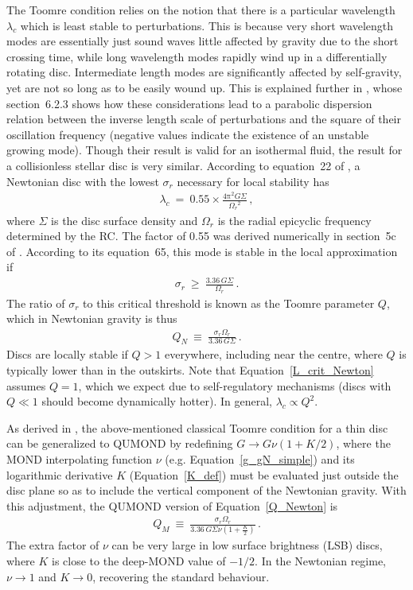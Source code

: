 \documentclass[fleqn,usenatbib,useAMS,onecolumn]{mnras} %
\begin{document}
The Toomre condition relies on the notion that there is a particular wavelength $\lambda_c$ which is least stable to perturbations. This is because very short wavelength modes are essentially just sound waves little affected by gravity due to the short crossing time, while long wavelength modes rapidly wind up in a differentially rotating disc. Intermediate length modes are significantly affected by self-gravity, yet are not so long as to be easily wound up. This is explained further in \citet{Galactic_Dynamics}, whose section~6.2.3 shows how these considerations lead to a parabolic dispersion relation between the inverse length scale of perturbations and the square of their oscillation frequency (negative values indicate the existence of an unstable growing mode). Though their result is valid for an isothermal fluid, the result for a collisionless stellar disc is very similar. According to equation~22 of \citet{Toomre_1964}, a Newtonian disc with the lowest $\sigma_r$ necessary for local stability has
\begin{eqnarray}
	\lambda_c ~=~ 0.55 \times \frac{4 \mathrm{\pi}^2 G \Sigma}{{\Omega_r}^2} \, ,
	\label{L_crit_Newton}
\end{eqnarray}
where $\Sigma$ is the disc surface density and $\Omega_r$ is the radial epicyclic frequency determined by the RC. The factor of 0.55 was derived numerically in section~5c of \citet{Toomre_1964}. According to its equation~65, this mode is stable in the local approximation if
\begin{eqnarray}
	\sigma_r ~\geq~ \frac{3.36 \, G \Sigma}{\Omega_r} \, .
	\label{Min_sigma_r_Newton}
\end{eqnarray}
The ratio of $\sigma_r$ to this critical threshold is known as the Toomre parameter $Q$, which in Newtonian gravity is thus
\begin{eqnarray}
	Q_N ~\equiv~ \frac{\sigma_r \Omega_r}{3.36 \, G \Sigma} \, .
	\label{Q_Newton}
\end{eqnarray}
Discs are locally stable if $Q > 1$ everywhere, including near the centre, where $Q$ is typically lower than in the outskirts. Note that Equation~\ref{L_crit_Newton} assumes $Q = 1$, which we expect due to self-regulatory mechanisms (discs with $Q \ll 1$ should become dynamically hotter). In general, $\lambda_c \propto Q^2$.

As derived in \citet{Banik_2018_Toomre}, the above-mentioned classical Toomre condition for a thin disc can be generalized to QUMOND by redefining $G \to G \nu \left( 1 + K/2 \right)$, where the MOND interpolating function $\nu$ (e.g. Equation~\ref{g_gN_simple}) and its logarithmic derivative $K$ (Equation~\ref{K_def}) must be evaluated just outside the disc plane so as to include the vertical component of the Newtonian gravity. With this adjustment, the QUMOND version of Equation~\ref{Q_Newton} is
\begin{eqnarray}
	Q_M ~\equiv~ \frac{\sigma_r \Omega_r}{3.36 \, G \Sigma \nu \left( 1 + \frac{K}{2} \right)} \, .
	\label{Toomre_MOND}
\end{eqnarray}
The extra factor of $\nu$ can be very large in low surface brightness (LSB) discs, where $K$ is close to the deep-MOND value of $-1/2$. In the Newtonian regime, $\nu \to 1$ and $K \to 0$, recovering the standard behaviour.
\end{document}
